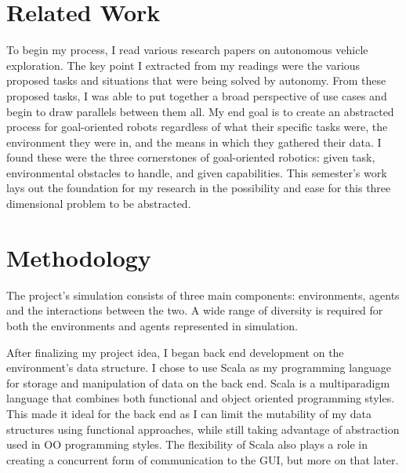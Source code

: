 \documentclass[]{report}
\begin{document}
\chapter{Related Work}
To begin my process, I read various research papers on autonomous vehicle exploration.
The key point I extracted from my readings were the various proposed tasks and situations that were being solved by autonomy.
From these proposed tasks, I was able to put together a broad perspective of use cases and begin to draw parallels between them all.
My end goal is to create an abstracted process for goal-oriented robots regardless of what their specific tasks were, the environment they were in, and the means in which they gathered their data.
I found these were the three cornerstones of goal-oriented robotics: given task, environmental obstacles to handle, and given capabilities.
This semester’s work lays out the foundation for my research in the possibility and ease for this three dimensional problem to be abstracted.



\chapter{Methodology}
The project’s simulation consists of three main components: environments, agents and the interactions between the two.
A wide range of diversity is required for both the environments and agents represented in simulation.

After finalizing my project idea, I began back end development on the environment’s data structure.
I chose to use Scala as my programming language for storage and manipulation of data on the back end.
Scala is a multiparadigm language that combines both functional and object oriented programming styles.
This made it ideal for the back end as I can limit the mutability of my data structures using functional approaches, while still taking advantage of abstraction used in OO programming styles.
The flexibility of Scala also plays a role in creating a concurrent form of communication to the GUI, but more on that later.
\end{document}
